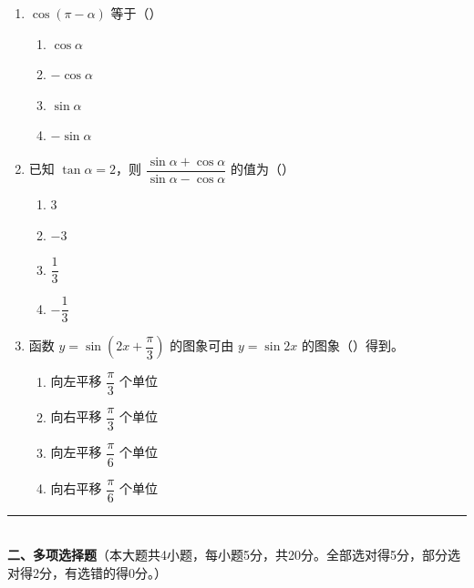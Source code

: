 \documentclass[12pt, a4paper]{ctexart}
\begin{document}
\begin{enumerate}
\item $\cos(\pi-\alpha)$ 等于（\quad）
  \begin{enumerate}[label=\Alph*., itemsep=0pt]
    \item $\cos\alpha$ \quad \item $-\cos\alpha$ \quad \item $\sin\alpha$ \quad \item $-\sin\alpha$
  \end{enumerate}

\item 已知 $\tan\alpha=2$，则 $\dfrac{\sin\alpha+\cos\alpha}{\sin\alpha-\cos\alpha}$ 的值为（\quad）
  \begin{enumerate}[label=\Alph*., itemsep=0pt]
    \item $3$ \quad \item $-3$ \quad \item $\dfrac{1}{3}$ \quad \item $-\dfrac{1}{3}$
  \end{enumerate}

\item 函数 $y=\sin\!\left(2x+\dfrac{\pi}{3}\right)$ 的图象可由 $y=\sin 2x$ 的图象（\quad）得到。
  \begin{enumerate}[label=\Alph*., itemsep=0pt]
    \item 向左平移 $\dfrac{\pi}{3}$ 个单位 \quad \item 向右平移 $\dfrac{\pi}{3}$ 个单位
    \item 向左平移 $\dfrac{\pi}{6}$ 个单位 \quad \item 向右平移 $\dfrac{\pi}{6}$ 个单位
  \end{enumerate}
\end{enumerate}

\vspace{6pt}

\noindent\rule{\textwidth}{0.4pt}\\[2pt]
{\large\bfseries 二、多项选择题}（本大题共4小题，每小题5分，共20分。全部选对得5分，部分选对得2分，有选错的得0分。）

\vspace{6pt}
\end{document}
